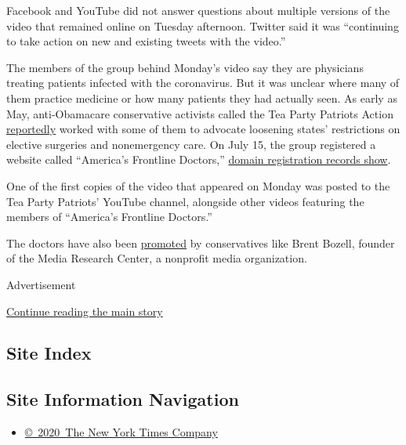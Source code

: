 Facebook and YouTube did not answer questions about multiple versions of
the video that remained online on Tuesday afternoon. Twitter said it was
``continuing to take action on new and existing tweets with the video.''

The members of the group behind Monday's video say they are physicians
treating patients infected with the coronavirus. But it was unclear
where many of them practice medicine or how many patients they had
actually seen. As early as May, anti-Obamacare conservative activists
called the Tea Party Patriots Action
\href{https://news.bloomberglaw.com/health-law-and-business/hospitals-doctors-get-conservatives-push-for-elective-care}{reportedly}
worked with some of them to advocate loosening states' restrictions on
elective surgeries and nonemergency care. On July 15, the group
registered a website called ``America's Frontline Doctors,''
\href{https://whois.domaintools.com/americasfrontlinedoctors.com}{domain
registration records show}.

One of the first copies of the video that appeared on Monday was posted
to the Tea Party Patriots' YouTube channel, alongside other videos
featuring the members of ``America's Frontline Doctors.''

The doctors have also been
\href{https://twitter.com/daveyalba/status/1287933609433804802}{promoted}
by conservatives like Brent Bozell, founder of the Media Research
Center, a nonprofit media organization.

Advertisement

\protect\hyperlink{after-bottom}{Continue reading the main story}

\hypertarget{site-index}{%
\subsection{Site Index}\label{site-index}}

\hypertarget{site-information-navigation}{%
\subsection{Site Information
Navigation}\label{site-information-navigation}}

\begin{itemize}
\tightlist
\item
  \href{https://help.nytimes3xbfgragh.onion/hc/en-us/articles/115014792127-Copyright-notice}{©~2020~The
  New York Times Company}
\end{itemize}

